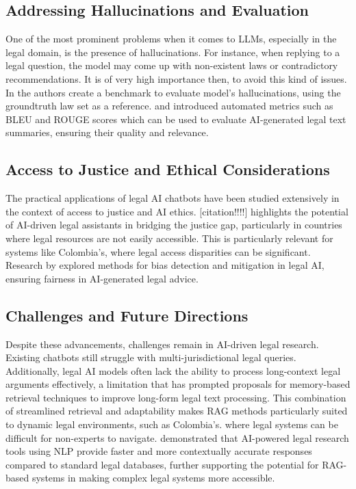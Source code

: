 \subsection{Addressing Hallucinations and Evaluation}
One of the most prominent problems when it comes to LLMs, especially in the legal domain, 
is the presence of hallucinations. For instance, when replying to a legal question, 
the model may come up with non-existent laws or contradictory recommendations. 
It is of very high importance then, to avoid this kind of issues. 
In \cite{hu2025finetuninglargelanguagemodels} the authors create a benchmark 
to evaluate model's hallucinations, using the groundtruth law set as a reference.
\cite{Papineni_bleu} and \cite{lin-2004-rouge} introduced automated metrics 
such as BLEU and ROUGE scores which can be used to evaluate AI-generated 
legal text summaries, ensuring their quality and relevance.

\subsection{Access to Justice and Ethical Considerations}
The practical applications of legal AI chatbots have been studied extensively 
in the context of access to justice and AI ethics. 
[citation!!!!] highlights the potential of AI-driven legal assistants in bridging 
the justice gap, particularly in countries where legal resources are not easily 
accessible. This is particularly relevant for systems like Colombia's, 
where legal access disparities can be significant. 
Research by \cite{Min_bias} explored methods for bias detection and mitigation 
in legal AI, ensuring fairness in AI-generated legal advice.

\subsection{Challenges and Future Directions}
Despite these advancements, challenges remain in AI-driven legal research. 
Existing chatbots still struggle with multi-jurisdictional legal queries. 
Additionally, legal AI models often lack the ability to process long-context 
legal arguments effectively, a limitation that has prompted proposals for 
memory-based retrieval techniques to improve long-form legal text processing.
This combination of streamlined retrieval and adaptability makes RAG methods 
particularly suited to dynamic legal environments, such as Colombia's. where 
legal systems can be difficult for non-experts to navigate. 
\cite{Singh_legal} demonstrated that AI-powered legal research tools using 
NLP provide faster and more contextually accurate responses compared to standard legal 
databases, further supporting the potential for RAG-based systems in making 
complex legal systems more accessible.

